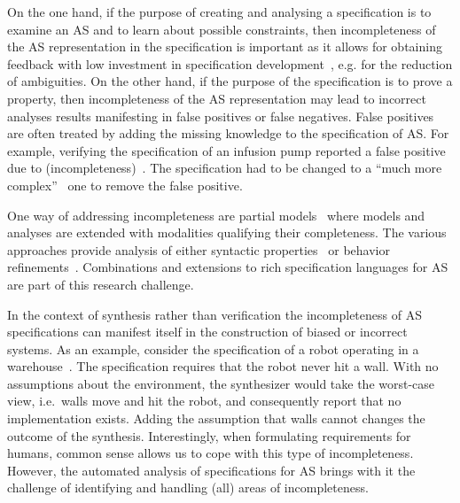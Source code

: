 \documentclass[sigconf,nonacm]{acmart}%
\begin{document}
	On the one hand, if the purpose of creating and analysing a specification is to examine an AS and to learn about possible constraints, then incompleteness of the AS representation in the specification is important as it allows for obtaining feedback with low investment in specification development~\cite{Jackson19}, e.g. for the reduction of ambiguities. 
	On the other hand, if the purpose of the specification is to prove a property, then incompleteness of the AS representation may lead to incorrect analyses results manifesting in false positives or false negatives. False positives are often treated by adding the missing knowledge to the specification of AS. For example, verifying the specification of an infusion pump reported a false positive due to (incompleteness)~\cite{HarrisonMCC17}. The specification had to be changed to a ``much more complex''~\cite{HarrisonMCC17} one to remove the false positive.

    One way of addressing incompleteness are partial models~\cite{WeiGC11,FamelisSC12,FischbeinDBCU12} where models and analyses are extended with modalities qualifying their completeness. The various approaches provide analysis of either syntactic properties~\cite{FamelisSC12} or behavior refinements~\cite{WeiGC11,FischbeinDBCU12}. Combinations and extensions to rich specification languages for AS are part of this research challenge.
	
	In the context of synthesis rather than verification the incompleteness of AS specifications can manifest itself in the construction of biased or incorrect systems. 
	As an example, consider the specification of a robot operating in a warehouse~\cite{MaozR18robot}. The specification requires that the robot never hit a wall. With no assumptions about the environment, the synthesizer would take the worst-case view, i.e.\ walls move and hit the robot, and consequently report that no implementation exists. Adding the assumption that walls cannot changes the outcome of the synthesis. 
	Interestingly, when formulating requirements for humans, common sense allows us to cope with this type of incompleteness. 
	However, the automated analysis of specifications for AS brings with it the challenge of identifying and handling (all) areas of incompleteness.
	
\end{document}
